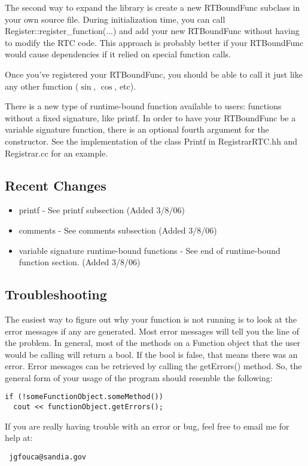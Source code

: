 \documentclass{article}
\begin{document}
\noindent
The second way to expand the library is create a new RTBoundFunc subclass in
your own source file. During initialization time, you can call 
Register::register\_function(...) and add your new RTBoundFunc without having
to modify the RTC code. This approach is probably better if your RTBoundFunc
would cause dependencies if it relied on special function calls. 

\noindent
Once you've registered your RTBoundFunc, you should be able to call it just 
like any other function ($\sin$, $\cos$, etc).

\noindent
There is a new type of runtime-bound function available to users: functions
without a fixed signature, like printf. In order to have your RTBoundFunc be
a variable signature function, there is an optional fourth argument for the
constructor. See the implementation of the class Printf in RegistrarRTC.hh and
Registrar.cc for an example.

\subsection{Recent Changes}

\begin{itemize}
  \item printf - See printf subsection (Added 3/8/06)
  \item comments - See comments subsection (Added 3/8/06)
  \item variable signature runtime-bound functions - See end of runtime-bound 
        function section. (Added 3/8/06)
\end{itemize}

\subsection{Troubleshooting}

The easiest way to figure out why your function is not running is to look at
the error messages if any are generated. Most error messages will tell you the
line of the problem. In general, most of the methods on a Function object that 
the user would be calling will return a bool. If the bool is false, that means
there was an error. Error messages can be retrieved by calling the getErrors() 
method. So, the general form of your usage of the program should resemble the 
following:
{\ttfamily \begin{verbatim}
if (!someFunctionObject.someMethod()) 
  cout << functionObject.getErrors();
\end{verbatim} }

\noindent
If you are really having trouble with an error or bug, feel free to email me
for help at: \begin{verbatim} jgfouca@sandia.gov \end{verbatim}
\end{document}
